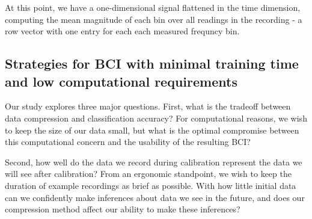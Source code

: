 




At this point, we have a one-dimensional signal flattened in the time dimension, computing the mean magnitude of each bin over all readings in the recording - a row vector with one entry for each each measured frequncy bin. 

\subsection{Strategies for BCI with minimal training time and low computational requirements}

Our study explores three major questions. First, what is the tradeoff between data compression and classification accuracy? For computational reasons, we wish to keep the size of our data small, but what is the optimal compromise between this computational concern and the usability of the resulting BCI?

Second, how well do the data we record during calibration represent the data we will see after calibration? From an ergonomic standpoint, we wish to keep the duration of example recordings as brief as possible. With how little initial data can we confidently make inferences about data we see in the future, and does our compression method affect our ability to make these inferences?

